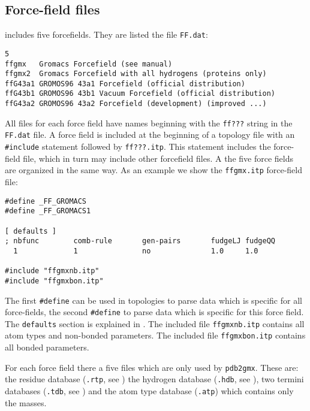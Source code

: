 \subsection{Force-field files}
\label{subsec:fffiles}
{\gromacs} {\gmxver} includes five forcefields.
They are listed the file {\tt FF.dat}:
\begin{verbatim}
5
ffgmx   Gromacs Forcefield (see manual)
ffgmx2  Gromacs Forcefield with all hydrogens (proteins only)
ffG43a1 GROMOS96 43a1 Forcefield (official distribution)
ffG43b1 GROMOS96 43b1 Vacuum Forcefield (official distribution)
ffG43a2 GROMOS96 43a2 Forcefield (development) (improved ...)
\end{verbatim}
All files for each force field have names beginning with the {\tt ff???}
string in the {\tt FF.dat} file.
A force field is included at the beginning of a topology file with an
{\tt \#include} statement followed by {\tt ff???.itp}.
This statement includes the force-field file,
which in turn may include other forcefield files. A the five force fields
are organized in the same way. As an example we show the {\tt ffgmx.itp}
force-field file:
\begin{verbatim}
#define _FF_GROMACS
#define _FF_GROMACS1

[ defaults ]
; nbfunc        comb-rule       gen-pairs       fudgeLJ fudgeQQ
  1             1               no              1.0     1.0

#include "ffgmxnb.itp"
#include "ffgmxbon.itp"
\end{verbatim}
The first {\tt \#define} can be used in topologies to parse data which is
specific for all {\gromacs} force-fields, the second {\tt \#define} to parse
data which is specific for this force field. The {\tt defaults} section is
explained in . The included file {\tt ffgmxnb.itp} contains
all atom types and non-bonded parameters. The included file {\tt ffgmxbon.itp}
contains all bonded parameters.

For each force field there a five files which are only used by {\tt pdb2gmx}.
These are: the residue database ({\tt .rtp}, see )
the hydrogen database ({\tt .hdb}, see ), two termini databases
({\tt .tdb}, see ) and
the atom type database ({\tt .atp}) which contains only the masses.


